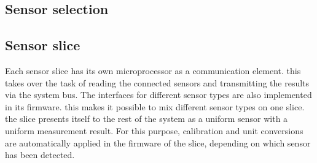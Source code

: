 \documentclass[conference]{IEEEtran}
\begin{document}
\subsection{Sensor selection}
\subsection{Sensor slice}

Each sensor slice has its own microprocessor as a communication element. this takes over the task of reading the connected sensors and transmitting the results via the system bus.
The interfaces for different sensor types are also implemented in its firmware. this makes it possible to mix different sensor types on one slice. the slice presents itself to the rest of the system as a uniform sensor with a uniform measurement result.
For this purpose, calibration and unit conversions are automatically applied in the firmware of the slice, depending on which sensor has been detected.
\end{document}
